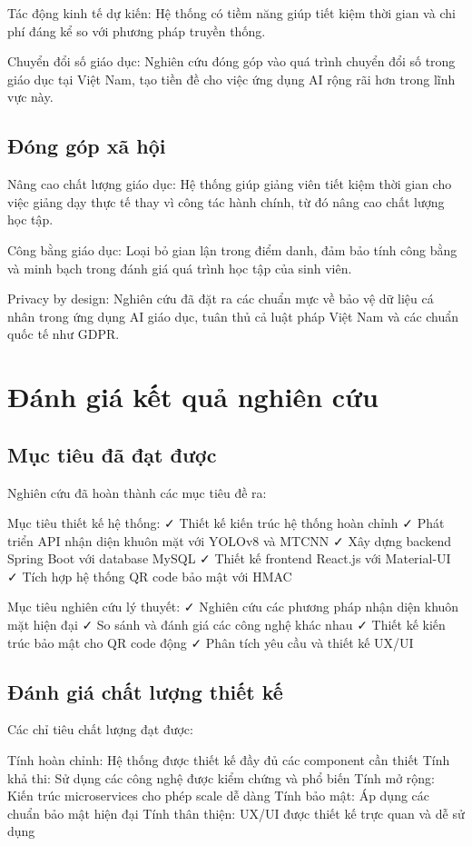 \documentclass[12pt,a4paper]{report}
\begin{document}
Tác động kinh tế dự kiến: Hệ thống có tiềm năng giúp tiết kiệm thời gian và chi phí đáng kể so với phương pháp truyền thống.

Chuyển đổi số giáo dục: Nghiên cứu đóng góp vào quá trình chuyển đổi số trong giáo dục tại Việt Nam, tạo tiền đề cho việc ứng dụng AI rộng rãi hơn trong lĩnh vực này.

\subsection{Đóng góp xã hội}
Nâng cao chất lượng giáo dục: Hệ thống giúp giảng viên tiết kiệm thời gian cho việc giảng dạy thực tế thay vì công tác hành chính, từ đó nâng cao chất lượng học tập.

Công bằng giáo dục: Loại bỏ gian lận trong điểm danh, đảm bảo tính công bằng và minh bạch trong đánh giá quá trình học tập của sinh viên.

Privacy by design: Nghiên cứu đã đặt ra các chuẩn mực về bảo vệ dữ liệu cá nhân trong ứng dụng AI giáo dục, tuân thủ cả luật pháp Việt Nam và các chuẩn quốc tế như GDPR.

\section{Đánh giá kết quả nghiên cứu}
\subsection{Mục tiêu đã đạt được}
Nghiên cứu đã hoàn thành các mục tiêu đề ra:

Mục tiêu thiết kế hệ thống:
✓ Thiết kế kiến trúc hệ thống hoàn chỉnh
✓ Phát triển API nhận diện khuôn mặt với YOLOv8 và MTCNN
✓ Xây dựng backend Spring Boot với database MySQL
✓ Thiết kế frontend React.js với Material-UI
✓ Tích hợp hệ thống QR code bảo mật với HMAC

Mục tiêu nghiên cứu lý thuyết:
✓ Nghiên cứu các phương pháp nhận diện khuôn mặt hiện đại
✓ So sánh và đánh giá các công nghệ khác nhau
✓ Thiết kế kiến trúc bảo mật cho QR code động
✓ Phân tích yêu cầu và thiết kế UX/UI

\subsection{Đánh giá chất lượng thiết kế}
Các chỉ tiêu chất lượng đạt được:

Tính hoàn chỉnh: Hệ thống được thiết kế đầy đủ các component cần thiết
Tính khả thi: Sử dụng các công nghệ được kiểm chứng và phổ biến
Tính mở rộng: Kiến trúc microservices cho phép scale dễ dàng
Tính bảo mật: Áp dụng các chuẩn bảo mật hiện đại
Tính thân thiện: UX/UI được thiết kế trực quan và dễ sử dụng
\end{document}
